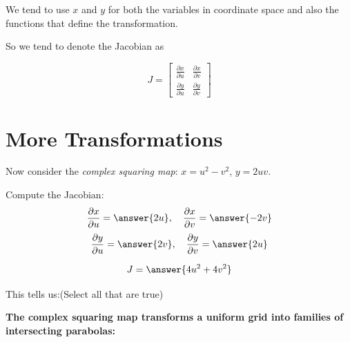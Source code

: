 \documentclass{ximera}
\begin{document}
\begin{center}
\end{center}

\begin{remark}
  We tend to use $x$ and $y$ for both the variables in coordinate space and also the functions that define the transformation.  

  So we tend to denote the Jacobian as 

$$J = \begin{bmatrix}
    \frac{\partial x}{\partial u} & \frac{\partial x}{\partial v} \\[6pt]
    \frac{\partial y}{\partial u} & \frac{\partial y}{\partial v}
  \end{bmatrix}$$
\end{remark}

\section*{More Transformations}


\begin{problem}
Now consider the \emph{complex squaring map}: $x = u^2 - v^2$, $y = 2uv$.

Compute the Jacobian:
$$\frac{\partial x}{\partial u} = \answer{2u}, \quad \frac{\partial x}{\partial v} = \answer{-2v}$$
$$\frac{\partial y}{\partial u} = \answer{2v}, \quad \frac{\partial y}{\partial v} = \answer{2u}$$

$$J = \answer{4u^2 + 4v^2}$$

This tells us:(Select all that are true)
\begin{selectAll}
\end{selectAll}

\end{problem}

\textbf{The complex squaring map transforms a uniform grid into families of intersecting parabolas:}
\end{document}
